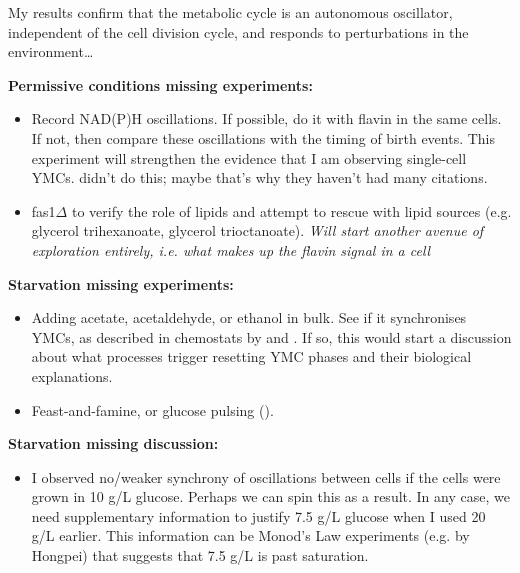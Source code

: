 My results confirm that the metabolic cycle is an autonomous oscillator, independent of the cell division cycle, and responds to perturbations in the environment\ldots{}

\textbf{Permissive conditions missing experiments:}
\begin{itemize}
\item Record NAD(P)H oscillations.  If possible, do it with flavin in the same cells.  If not, then compare these oscillations with the timing of birth events.  This experiment will strengthen the evidence that I am observing single-cell YMCs.  \textcite{baumgartnerFlavinbasedMetabolicCycles2018} didn't do this; maybe that's why they haven't had many citations.
\item fas1$\Delta$ to verify the role of lipids and attempt to rescue with lipid sources (e.g. glycerol trihexanoate, glycerol trioctanoate). \emph{Will start another avenue of exploration entirely, i.e. what makes up the flavin signal in a cell}
\end{itemize}

\textbf{Starvation missing experiments:}
\begin{itemize}
\item Adding acetate, acetaldehyde, or ethanol in bulk.  See if it synchronises YMCs, as described in chemostats by \textcite{kuangMsn2RegulateExpression2017} and \textcite{krishnaMinimalPushPull2018} .  If so, this would start a discussion about what processes trigger resetting YMC phases and their biological explanations.
\item Feast-and-famine, or glucose pulsing (\textcite{charvinForcedPeriodicExpression2009}).
\end{itemize}

\textbf{Starvation missing discussion:}
\begin{itemize}
  \item I observed no/weaker synchrony of oscillations between cells if the cells were grown in 10 g/L glucose.  Perhaps we can spin this as a result.  In any case, we need supplementary information to justify 7.5 g/L glucose when I used 20 g/L earlier.  This information can be Monod's Law experiments (e.g. by Hongpei) that suggests that 7.5 g/L is past saturation.
\end{itemize}


